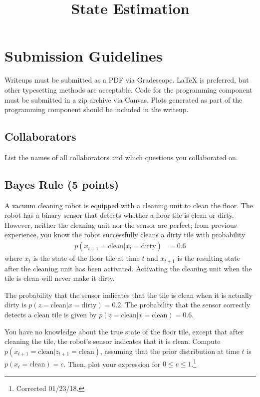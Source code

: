 \documentclass{article}
\title{State Estimation}
\author{}
\date{}
\newcommand{\?}{\stackrel{?}{=}}
\begin{document}
\maketitle

\section*{Submission Guidelines}

Writeups must be submitted as a PDF via Gradescope.
\LaTeX{} is preferred, but other typesetting methods are acceptable.
Code for the programming component must be submitted in a zip archive via Canvas.
Plots generated as part of the programming component should be included in the writeup.


\subsection{Collaborators}

List the names of all collaborators and which questions you collaborated on.


\subsection{Bayes Rule (5 points)}

A vacuum cleaning robot is equipped with a cleaning unit to clean the floor.
The robot has a binary sensor that detects whether a floor tile is clean or dirty.
However, neither the cleaning unit nor the sensor are perfect;
from previous experience, you know the robot successfully cleans a dirty tile with probability
\begin{align*}
  p(x_{t+1} = \text{clean} | x_{t} = \text{dirty}) &= 0.6
\end{align*}
where $x_t$ is the state of the floor tile at time $t$ and $x_{t+1}$ is the resulting state after the cleaning unit has been activated.
Activating the cleaning unit when the tile is clean will never make it dirty.

The probability that the sensor indicates that the tile is clean when it is actually dirty is $p(z = \text{clean} | x = \text{dirty}) = 0.2$.
The probability that the sensor correctly detects a clean tile is given by $p(z = \text{clean} | x = \text{clean}) = 0.6$.

You have no knowledge about the true state of the floor tile, except that after cleaning the tile, the robot's sensor indicates that it is clean.
Compute $p(x_{t+1} = \text{clean} | z_{t+1} = \text{clean})$, assuming that the prior distribution at time $t$ is $p(x_t = \text{clean}) = c$.
Then, plot your expression for $0 \leq c \leq 1$.\footnote{Corrected 01/23/18.}
\end{document}
